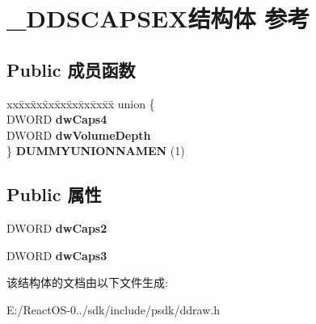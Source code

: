 \hypertarget{struct___d_d_s_c_a_p_s_e_x}{}\section{\+\_\+\+D\+D\+S\+C\+A\+P\+S\+E\+X结构体 参考}
\label{struct___d_d_s_c_a_p_s_e_x}
\subsection*{Public 成员函数}
\begin{DoxyCompactItemize}
\item 
\mbox{\label{struct___d_d_s_c_a_p_s_e_x_a0e6f2197755069f43a33a35c317b44cb}} 
\begin{tabbing}
xx\=xx\=xx\=xx\=xx\=xx\=xx\=xx\=xx\=\kill
union \{\\
\>DWORD {\bfseries dwCaps4}\\
\>DWORD {\bfseries dwVolumeDepth}\\
\} {\bfseries DUMMYUNIONNAMEN} (1)\\

\end{tabbing}\end{DoxyCompactItemize}
\subsection*{Public 属性}
\begin{DoxyCompactItemize}
\item 
\mbox{\label{struct___d_d_s_c_a_p_s_e_x_a958ac03fc513870881f0b6fe7659ca01}} 
D\+W\+O\+RD {\bfseries dw\+Caps2}
\item 
\mbox{\label{struct___d_d_s_c_a_p_s_e_x_a895e2bda8de0a92296edf7264426c4b7}} 
D\+W\+O\+RD {\bfseries dw\+Caps3}
\end{DoxyCompactItemize}


该结构体的文档由以下文件生成\+:\begin{DoxyCompactItemize}
\item 
E\+:/\+React\+O\+S-\/0../sdk/include/psdk/ddraw.\+h\end{DoxyCompactItemize}
